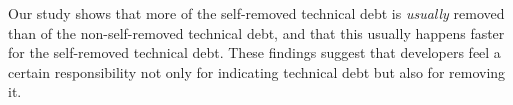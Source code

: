 
Our study shows that more of the self-removed technical debt is \emph{usually} removed than of the non-self-removed technical debt,
and that this usually happens faster for the self-removed technical debt.
These findings suggest that developers feel a certain responsibility not only for indicating technical debt but also for removing it.

